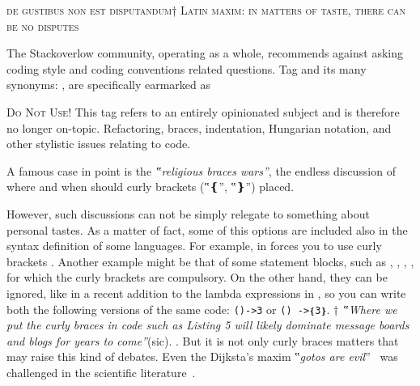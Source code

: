\begin{flushright}
  \scriptsize
\textsc{de gustibus non est disputandum†{%
    Latin maxim: in matters of taste, there can be no disputes
}}
\end{flushright}
\vspace{-1ex}

The Stackoverlow community, operating as a whole,
recommends against asking coding style and coding conventions related
questions. Tag  and its many synonyms: ,
 are specifically
earmarked as

{\scriptsize
\begin{tcolorbox}[colback=green!5!white,colframe=blue!25!white,notitle]
  \textsc{Do Not Use!}
This tag refers to an entirely opinionated subject and is therefore
no longer on-topic. Refactoring, braces, indentation, Hungarian notation, and
other stylistic issues relating to code.
\end{tcolorbox}}

A famous case in point is the \emph{‟religious braces wars”}, the endless
discussion of where and when should curly brackets (‟\cc❴”, ‟\cc❵”) placed.

However, such discussions can not be simply relegate to something about
personal tastes.  As a matter of fact, some of this options are included also
in the syntax definition of some languages.  For example, in \Go forces you to
use curly brackets .  Another
example might be that of some \Java statement blocks, such as
, , , , for which the curly
brackets are compulsory.  On the other hand, they can be ignored, like in a
recent addition to the lambda expressions
in \Java, so you can write both the following versions of the same code:
\texttt{()->3} or \texttt{() ->❴3❵}.  †{%
\emph{‟Where we put the curly braces in code such as Listing 5 will likely dominate \Java message boards and blogs for years to come”}(sic).
}.
But it is not only curly braces matters that may raise this kind of debates.
Even the Dijksta's maxim ‟\emph{gotos are evil}”~\cite{Dijkstra:68}
was challenged in the scientific literature~\cite{Knuth:74,Ramshaw:88,Bochmann:73,Sennesh:Gil:16,Zoethout:79,Wulf:79,Clark:84}.

